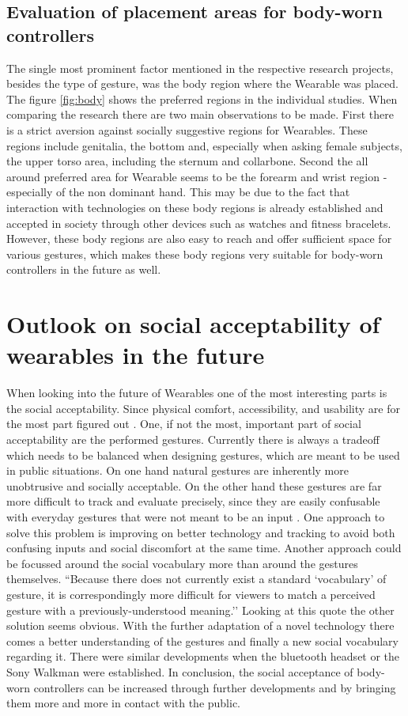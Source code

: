 \documentclass{sigchi}
\begin{document}
\subsection{Evaluation of placement areas for body-worn controllers }
The single most prominent factor mentioned in the respective research projects, besides the type of gesture, was the body region where the Wearable was placed. The figure \ref{fig:body} shows the preferred regions in the individual studies. When comparing the research there are two main observations to be made. First there is a strict aversion against socially suggestive regions for Wearables. These regions include genitalia, the bottom and, especially when asking female subjects, the upper torso area, including the sternum and collarbone.
Second the all around preferred area for Wearable seems to be the forearm and wrist region - especially of the non dominant hand. \cite{touch-wrist,pinstripe,social-comfort,belt} %
This may be due to the fact that interaction with technologies on these body regions is already established and accepted in society through other devices such as watches and fitness bracelets. However, these body regions are also easy to reach and offer sufficient space for various gestures, which makes these body regions very suitable for body-worn controllers in the future as well.
\section{Outlook on social acceptability of wearables in the future}
When looking into the future of Wearables one of the most interesting parts is the social acceptability. Since physical comfort, accessibility, and usability are for the most part figured out \cite{social-comfort}.
One, if not the most, important part of social acceptability are the performed gestures. Currently there is always a tradeoff which needs to be balanced when designing gestures, which are meant to be used in public situations. On one hand natural gestures are inherently more unobtrusive and socially acceptable. On the other hand these gestures are far more difficult to track and evaluate precisely, since they are easily confusable with everyday gestures that were not meant to be an input \cite{social-comfort}.
One approach to solve this problem is improving on better technology and tracking to avoid both confusing inputs and social discomfort at the same time. Another approach could be focussed around the social vocabulary more than around the gestures themselves.
``Because there does not currently exist a standard `vocabulary’ of gesture, it is correspondingly more difficult for viewers to match a perceived gesture with a previously-understood meaning.'' \cite[p. 4160]{social-comfort} %
Looking at this quote the other solution seems obvious. With the further adaptation of a novel technology there comes a better understanding of the gestures and finally a new social vocabulary regarding it. There were similar developments when the bluetooth headset \cite{social-comfort} or the Sony Walkman \cite{touch-wrist} were established.
In conclusion, the social acceptance of body-worn controllers can be increased through further developments and by bringing them more and more in contact with the public.

% 


\end{document}
